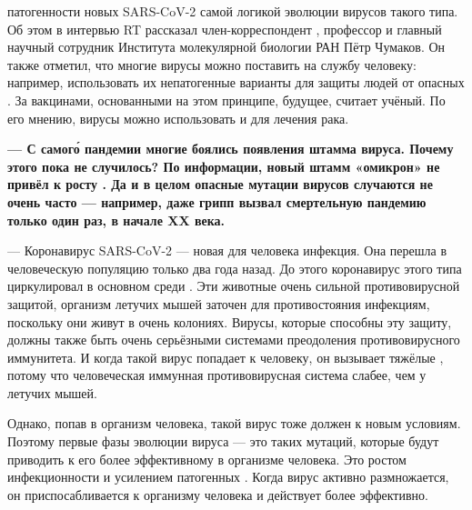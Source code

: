  патогенности новых  SARS-CoV-2  самой логикой эволюции вирусов такого типа. Об этом в интервью RT рассказал член-корреспондент , профессор и главный научный сотрудник Института молекулярной биологии РАН Пётр Чумаков. Он также отметил, что многие вирусы можно поставить на службу человеку: например, использовать их непатогенные варианты для защиты людей от опасных . За вакцинами, основанными на этом принципе, будущее, считает учёный. По его мнению, вирусы можно использовать и для лечения рака.

{\bf --- С самог\'{о}  пандемии многие боялись появления   штамма вируса. Почему этого пока не случилось? По  информации, новый штамм «омикрон» не привёл к  росту . Да и в целом опасные мутации  вирусов случаются не очень часто --- например, даже грипп вызвал смертельную пандемию только один раз, в начале XX века.}

--- Коронавирус SARS-CoV-2 --- новая для человека инфекция. Она перешла в человеческую популяцию только два года назад. До этого коронавирус этого типа циркулировал в основном среди . Эти животные  очень сильной противовирусной защитой, организм летучих мышей заточен для противостояния инфекциям, поскольку они живут в очень  колониях. Вирусы, которые способны  эту защиту, должны также быть  очень серьёзными системами преодоления противовирусного иммунитета. И когда такой вирус попадает к человеку, он вызывает тяжёлые , потому что человеческая иммунная противовирусная система слабее, чем у летучих мышей.

Однако, попав в организм человека, такой вирус тоже должен  к новым условиям. Поэтому первые фазы эволюции вируса --- это  таких мутаций, которые будут приводить к его более эффективному  в организме человека. Это  ростом инфекционности и усилением патогенных . Когда вирус активно размножается, он приспосабливается к организму человека и действует более эффективно.

